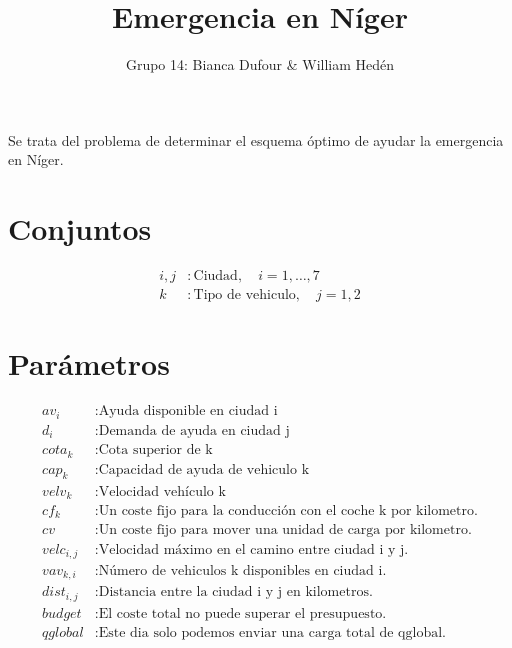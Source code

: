 \documentclass[]{article}
\title{Emergencia en Níger}
\author{Grupo 14: Bianca Dufour \& William Hedén}
\begin{document}
\maketitle

\noindent Se trata del problema de determinar el esquema óptimo de ayudar la emergencia en Níger.
\section{Conjuntos}
\begin{align*}
	i,j&: \text{Ciudad}, \quad i=1,\dots,7\\
	k&: \text{Tipo de vehiculo}, \quad j=1, 2
\end{align*}

\section{Parámetros}
\begin{align*}
	av_i &: \text{Ayuda disponible en ciudad i}\\
	d_i &: \text{Demanda de ayuda en ciudad j}\\
	cota_k &: \text{Cota superior de k}\\
	cap_k &: \text{Capacidad de ayuda de vehiculo k}\\
	velv_k &: \text{Velocidad vehículo k}\\
	cf_k &: \text{Un coste fijo para la conducción con el coche k por kilometro.}\\
	cv &: \text{Un coste fijo para mover una unidad de carga por kilometro.}\\
	velc_{i,j} &: \text{Velocidad máximo en el camino entre ciudad i y j.}\\
	vav_{k,i} &: \text{Número de vehiculos k disponibles en ciudad i.}\\
	dist_{i,j} &: \text{Distancia entre la ciudad i y j en kilometros.}\\
	budget &: \text{El coste total no puede superar el presupuesto.}\\
	qglobal &: \text{Este dia solo podemos enviar una carga total de qglobal.}
\end{align*}
\end{document}

